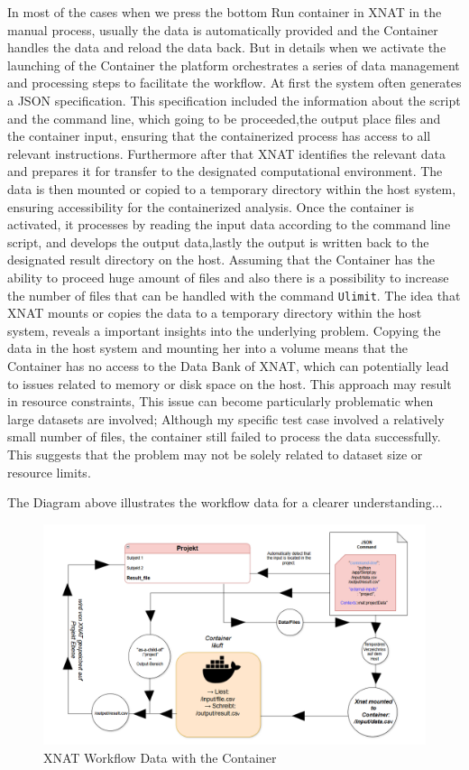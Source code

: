 In most of the cases when we press the bottom Run container in XNAT in the manual process, usually the data is automatically provided and the Container handles the data and reload the data back.
But in details when we activate the launching of the Container the platform orchestrates a series of data management and processing steps to facilitate the workflow. At first the system often generates a JSON specification. This specification included the information about the script and the command line, which going to be proceeded,the output place files and the container input, ensuring that the containerized process has access to all relevant instructions. Furthermore after that XNAT identifies the relevant data and prepares it for transfer to the designated computational environment. The data is then mounted or copied to a temporary directory within the host system, ensuring accessibility for the containerized analysis. Once the container is activated, it processes by reading the input data according to the command line script, and develops the output data,lastly the output is written back to the designated result directory on the host. 
Assuming  that the Container has the ability to proceed huge amount of files and also there is a possibility to increase the number of files that can be handled  with the command \texttt{Ulimit}. 
The idea that XNAT mounts or copies the data to a temporary directory within the host system, reveals a important insights into the underlying problem. Copying the data in the host system and mounting her into a volume means that the Container has no access to the Data Bank of XNAT, which can potentially lead to issues related to memory or disk space on the host. This approach may result in resource constraints, This issue can become particularly problematic when large datasets are involved; Although my specific test case involved a relatively small number of files, the container still failed to process the data successfully. This suggests that the problem may not be solely related to dataset size or resource limits.

The Diagram above illustrates the workflow data for a clearer understanding...\\
\begin{figure}
    \centering
    \includegraphics[width=1\linewidth]{en/content/bb.png}
    \caption{XNAT Workflow Data with the Container  }
    \label{fig:enter-label}
\end{figure}


